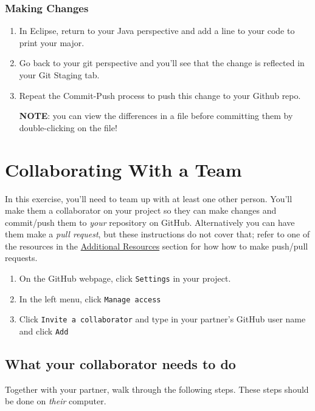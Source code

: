 \documentclass[12pt]{scrartcl}
\begin{document}
\subsubsection{Making Changes}

\begin{enumerate}
  \item In Eclipse, return to your Java perspective and add a line to your code 
  to print your major.  
  \item Go back to your git perspective and you'll see that the change is 
  reflected in your Git Staging tab.  
  \item Repeat the Commit-Push process to push this change to your Github repo.

  \textbf{NOTE}: you can view the differences in a file before committing them
  by double-clicking on the file!
\end{enumerate}

\section{Collaborating With a Team}

In this exercise, you'll need to team up with at least one other person.
You'll make them a collaborator on your project so they can make changes
and commit/push them to \emph{your} repository on GitHub.  Alternatively
you can have them make a \emph{pull request}, but these instructions do 
not cover that; refer to one of the resources in the 
\hyperref[section:additionalResources]{Additional Resources} section
for how how to make push/pull requests.

\begin{enumerate}
  \item On the GitHub webpage, click \texttt{Settings} in your project.
  \item In the left menu, click \texttt{Manage access}
  \item Click \texttt{Invite a collaborator} and type 
  in your partner's GitHub user name and click \texttt{Add}
\end{enumerate}

\subsection{What your collaborator needs to do}

Together with your partner, walk through the following steps.  These
steps should be done on \emph{their} computer.
\end{document}
